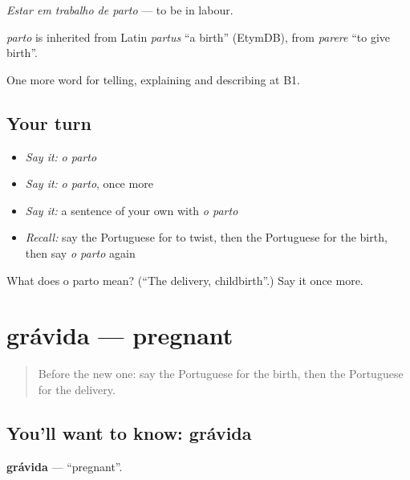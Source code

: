 \emph{Estar em trabalho de parto} — to be in labour.

\begin{cousinweb}
\emph{parto} is inherited from Latin \emph{partus} \textquotedblleft{}a birth\textquotedblright{} (EtymDB), from \emph{parere} \textquotedblleft{}to give birth\textquotedblright{}.
\end{cousinweb}

\begin{grammarlens}[title={What you've built}]
One more word for telling, explaining and describing at B1.
\end{grammarlens}

\subsection*{Your turn}
\begin{itemize}
\raggedright
  \item \emph{Say it:} \emph{o parto}
  \item \emph{Say it:} \emph{o parto}, once more
  \item \emph{Say it:} a sentence of your own with \emph{o parto}
  \item \emph{Recall:} say the Portuguese for to twist, then the Portuguese for the birth, then say \emph{o parto} again
\end{itemize}

\begin{tcolorbox}[breakable,colback=teal!4,colframe=teal!35!black,title={Before you move on}]
What does o parto mean? (\textquotedblleft{}The delivery, childbirth\textquotedblright{}.) Say it once more.
\end{tcolorbox}
\section[grávida]{grávida — pregnant}

\label{lesson:PT-C309-gravida}



\begin{quote}
Before the new one: say the Portuguese for the birth, then the Portuguese for the delivery.
\end{quote}

\subsection*{You'll want to know: grávida}
\textbf{grávida} — \textquotedblleft{}pregnant\textquotedblright{}.


